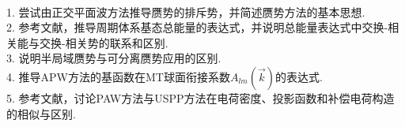 {%
%
%
 
\\
1. 尝试由正交平面波方法推导赝势的排斥势，并简述赝势方法的基本思想.\\
2. 参考文献，推导周期体系基态总能量的表达式，并说明总能量表达式中交换-相关能与交换-相关势的联系和区别.\\
3. 说明半局域赝势与可分离赝势应用的区别.\\
4. 推导APW方法的基函数在MT球面衔接系数$A_{lm}(\vec k)$的表达式.\\
5. 参考文献，讨论PAW方法与USPP方法在电荷密度、投影函数和补偿电荷构造的相似与区别.

}
